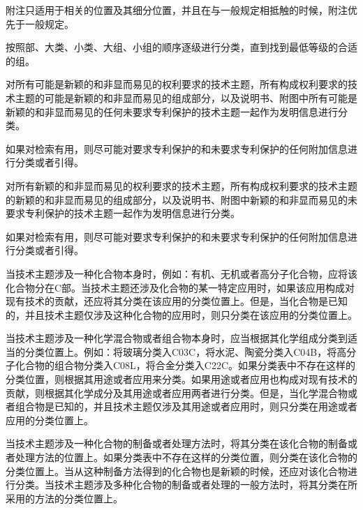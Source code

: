 附注只适用于相关的位置及其细分位置，并且在与一般规定相抵触的时候，附注优先于一般规定。

按照部、大类、小类、大组、小组的顺序逐级进行分类，直到找到最低等级的合适的组。

对所有可能是新颖的和非显而易见的权利要求的技术主题，所有构成权利要求的技术主题的可能是新颖的和非显而易见的组成部分，以及说明书、附图中所有可能是新颖的和非显而易见的任何未要求专利保护的技术主题一起作为发明信息进行分类。

如果对检索有用，则尽可能对要求专利保护的和未要求专利保护的任何附加信息进行分类或者引得。

对所有新颖的和非显而易见的权利要求的技术主题，所有构成权利要求的技术主题的新颖的和非显而易见的组成部分，以及说明书、附图中新颖的和非显而易见的未要求专利保护的技术主题一起作为发明信息进行分类。

如果对检索有用，则尽可能对要求专利保护的和未要求专利保护的任何附加信息进行分类或者引得。

当技术主题涉及一种化合物本身时，例如：有机、无机或者高分子化合物，应将该化合物分在C部。当技术主题还涉及化合物的某一特定应用时，如果该应用构成对现有技术的贡献，还应将其分类在该应用的分类位置上。但是，当化合物是已知的，并且技术主题仅涉及这种化合物的应用时，则只分类在该应用的分类位置上。

当技术主题涉及一种化学混合物或者组合物本身时，应当根据其化学组成分类到适当的分类位置上。例如：将玻璃分类入C03C，将水泥、陶瓷分类入C04B，将高分子化合物的组合物分类入C08L，将合金分类入C22C。如果分类表中不存在这样的分类位置，则根据其用途或者应用来分类。如果用途或者应用也构成对现有技术的贡献，则根据其化学成分及其用途或者应用两者进行分类。但是，当化学混合物或者组合物是已知的，并且技术主题仅涉及其用途或者应用时，则只分类在用途或者应用的分类位置上。

当技术主题涉及一种化合物的制备或者处理方法时，将其分类在该化合物的制备或者处理方法的位置上。如果分类表中不存在这样的分类位置，则分类在该化合物的分类位置上。当从这种制备方法得到的化合物也是新颖的时候，还应对该化合物进行分类。当技术主题涉及多种化合物的制备或者处理的一般方法时，将其分类在所采用的方法的分类位置上。

